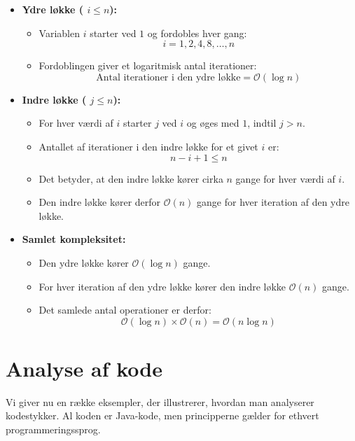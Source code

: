 \begin{example}
\begin{itemize}
    \item \textbf{Ydre løkke (\texttt{\While} $i \leq n$):}
    \begin{itemize}
        \item Variablen $i$ starter ved $1$ og fordobles hver gang:
        \[ i = 1, 2, 4, 8, \ldots, n \]
        \item Fordoblingen giver et logaritmisk antal iterationer:
        \[ \text{Antal iterationer i den ydre løkke} = \mathcal{O}(\log n) \]
    \end{itemize}
    \item \textbf{Indre løkke (\texttt{\While} $j \leq n$):}
    \begin{itemize}
        \item For hver værdi af $i$ starter $j$ ved $i$ og øges med $1$, indtil $j > n$.
        \item Antallet af iterationer i den indre løkke for et givet $i$ er:
        \[ n - i + 1 \leq n \]
        \item Det betyder, at den indre løkke kører cirka $n$ gange for hver værdi af $i$.
        \item Den indre løkke kører derfor $\mathcal{O}(n)$ gange for hver iteration af den ydre løkke.
    \end{itemize}
    \item \textbf{Samlet kompleksitet:}
    \begin{itemize}
        \item Den ydre løkke kører $\mathcal{O}(\log n)$ gange.
        \item For hver iteration af den ydre løkke kører den indre løkke $\mathcal{O}(n)$ gange.
        \item Det samlede antal operationer er derfor:
        \[ \mathcal{O}(\log n) \times \mathcal{O}(n) = \mathcal{O}(n \log n) \]
    \end{itemize}
\end{itemize}
    
\end{example}
    
\section{Analyse af kode}
Vi giver nu en række eksempler, der illustrerer, hvordan man analyserer kodestykker. Al koden er Java-kode, men principperne gælder for ethvert programmeringssprog.

